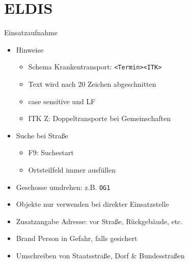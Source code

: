 \section{ELDIS}
\begin{sectionbox}{Einsatzaufnahme}
    \begin{itemize}
        \item Hinweise
        \begin{itemize}
            \item Schema Krankentransport: \texttt{<Termin><ITK>}
            \item Text wird nach 20 Zeichen abgeschnitten
            \item case sensitive und LF
            \item ITK Z: Doppeltransporte bei Gemeinschaften
        \end{itemize}
        \item Suche bei Straße
        \begin{itemize}
            \item F9: Suchestart
            \item Ortsteilfeld immer ausfüllen
        \end{itemize}
        \item Geschosse umdrehen: z.B. \texttt{OG1}
        \item Objekte nur verwenden bei direkter Einsatzstelle
        \item Zusatzangabe Adresse: vor Straße, Rückgebäude, etc.
        \item Brand Person in Gefahr, falls gesichert
        \item Umschreiben von Staatsstraße, Dorf \& Bundesstraßen
    \end{itemize}
\end{sectionbox}